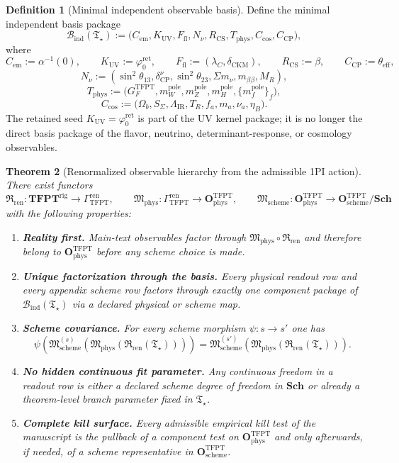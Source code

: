 \documentclass[11pt,a4paper]{article}
\newtheorem{theorem}{Theorem}[section]
\theoremstyle{definition}
\newtheorem{definition}[theorem]{Definition}
\theoremstyle{remark}
\newcommand{\phiz}{\varphi_0^{\mathrm{ret}}}
\newcommand{\Tstar}{\mathfrak T_{\star}}
\newcommand{\GrenTFPT}{\Gamma_{\mathrm{TFPT}}^{\mathrm{ren}}}
\newcommand{\OphysTFPT}{\mathbf O_{\mathrm{phys}}^{\mathrm{TFPT}}}
\newcommand{\OschemeTFPT}{\mathbf O_{\mathrm{scheme}}^{\mathrm{TFPT}}}
\newcommand{\SchGrp}{\mathbf{Sch}}
\newcommand{\Mphys}{\mathfrak M_{\mathrm{phys}}}
\newcommand{\Mscheme}{\mathfrak M_{\mathrm{scheme}}}
\newcommand{\Rren}{\mathfrak R_{\mathrm{ren}}}
\newcommand{\Bind}{\mathcal B_{\mathrm{ind}}}
\begin{document}
\begin{definition}[Minimal independent observable basis]
\label{def:minimal-observable-basis}
Define the minimal independent basis package
\[
\Bind(\Tstar):=
\bigl(
C_{\mathrm{em}},
K_{\mathrm{UV}},
F_{\mathrm{fl}},
N_{\nu},
R_{\mathrm{CS}},
T_{\mathrm{phys}},
C_{\mathrm{cos}},
C_{\mathrm{CP}}
\bigr),
\]
where
\[
C_{\mathrm{em}}:=\alpha^{-1}(0),
\qquad
K_{\mathrm{UV}}:=\phiz,
\qquad
F_{\mathrm{fl}}:=(\lambda_C,\delta_{\mathrm{CKM}}),
\qquad
R_{\mathrm{CS}}:=\beta,
\qquad
C_{\mathrm{CP}}:=\theta_{\mathrm{eff}},
\]
\[
N_{\nu}:=(\sin^2\theta_{13},\delta_{\mathrm{CP}}^\nu,\sin^2\theta_{23},\Sigma m_\nu,m_{\beta\beta},M_R),
\]
\[
T_{\mathrm{phys}}
:=
\bigl(
G_F^{\mathrm{TFPT}},
m_W^{\mathrm{pole}},
m_Z^{\mathrm{pole}},
m_H^{\mathrm{pole}},
\{m_f^{\mathrm{pole}}\}_f
\bigr),
\]
\[
C_{\mathrm{cos}}
:=
\bigl(
\Omega_b,S_\Sigma,\Lambda_{\mathrm{IR}},T_R,f_a,m_a,\nu_a,\eta_B
\bigr).
\]
The retained seed $K_{\mathrm{UV}}=\phiz$ is part of the UV kernel package; it is no longer the
direct basis package of the flavor, neutrino, determinant-response, or cosmology observables.
\end{definition}

\begin{theorem}[Renormalized observable hierarchy from the admissible 1PI action]
\label{thm:operational-completeness}
There exist functors
\[
\Rren:\mathbf{TFPT}^{\mathrm{rig}}\to\GrenTFPT,
\qquad
\Mphys:\GrenTFPT\to\OphysTFPT,
\qquad
\Mscheme:\OphysTFPT\to\OschemeTFPT/\SchGrp
\]
with the following properties:
\begin{enumerate}[label=\textbf{(O\arabic*)}, leftmargin=2em, topsep=3pt, itemsep=3pt]
    \item \textbf{Reality first.}
    Main-text observables factor through $\Mphys\!\circ\!\Rren$ and therefore belong to
    $\OphysTFPT$ before any scheme choice is made.
    \item \textbf{Unique factorization through the basis.}
    Every physical readout row and every appendix scheme row factors through exactly one component
    package of $\Bind(\Tstar)$ via a declared physical or scheme map.
    \item \textbf{Scheme covariance.}
    For every scheme morphism $\psi:s\to s'$ one has
    \[
    \psi\!\left(\Mscheme^{(s)}(\Mphys(\Rren(\Tstar)))\right)
    =
    \Mscheme^{(s')}(\Mphys(\Rren(\Tstar))).
    \]
    \item \textbf{No hidden continuous fit parameter.}
    Any continuous freedom in a readout row is either a declared scheme degree of freedom in
    $\SchGrp$ or already a theorem-level branch parameter fixed in $\Tstar$.
    \item \textbf{Complete kill surface.}
    Every admissible empirical kill test of the manuscript is the pullback of a component test on
    $\OphysTFPT$ and only afterwards, if needed, of a scheme representative in $\OschemeTFPT$.
\end{enumerate}
\end{theorem}
\end{document}
